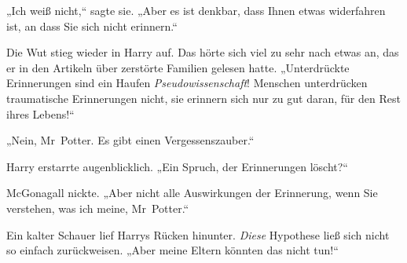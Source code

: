 „Ich weiß nicht,“ sagte sie. „Aber es ist denkbar, dass Ihnen etwas widerfahren ist, an dass Sie sich nicht erinnern.“

Die Wut stieg wieder in Harry auf. Das hörte sich viel zu sehr nach etwas an, das er in den Artikeln über zerstörte Familien gelesen hatte. „Unterdrückte Erinnerungen sind ein Haufen \emph{Pseudowissenschaft}! Menschen unterdrücken traumatische Erinnerungen nicht, sie erinnern sich nur zu gut daran, für den Rest ihres Lebens!“

„Nein, Mr~Potter. Es gibt einen Vergessenszauber.“

Harry erstarrte augenblicklich. „Ein Spruch, der Erinnerungen löscht?“

McGonagall nickte. „Aber nicht alle Auswirkungen der Erinnerung, wenn Sie verstehen, was ich meine, Mr~Potter.“

Ein kalter Schauer lief Harrys Rücken hinunter. \emph{Diese} Hypothese ließ sich nicht so einfach zurückweisen. „Aber meine Eltern könnten das nicht tun!“

